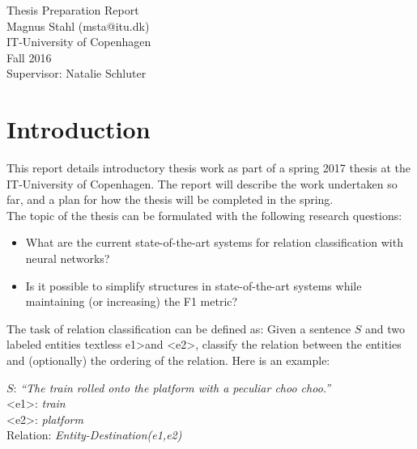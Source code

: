 \documentclass[12pt]{article}
\begin{document}
\begin{center}
    \vspace{2cm}
    \huge { Thesis Preparation Report \\ }
    \vspace{2cm}
    \large {Magnus Stahl (msta@itu.dk)\\
    IT-University of Copenhagen\\
    Fall 2016\\}
    \large {Supervisor: Natalie Schluter\\}
\end{center}


\tableofcontents

\newpage

    
\section{Introduction}
\label{intro}

This report details introductory thesis work as part of a spring 2017 thesis at the IT-University of Copenhagen. The report will describe the work undertaken so far, and a plan for how the thesis will be completed in the spring. \\

The topic of the thesis can be formulated with the following research questions:
\begin{itemize}
    \item What are the current state-of-the-art systems for relation classification 
    with neural networks?\\
    \item Is it possible to simplify structures in state-of-the-art systems while maintaining (or increasing) the F1 metric?
\end{itemize}

The task of relation classification can be defined as:
Given a sentence $S$ and two labeled entities textless e1\textgreater and \textless e2\textgreater, classify the relation between the entities and (optionally) the ordering of the relation. Here is an example:

\begin{center}

$S$: \emph{``The train rolled onto the platform with a peculiar choo choo.''} \\

\textless e1\textgreater: \emph{train} \\
\textless e2\textgreater: \emph{platform} \\

Relation: \emph{Entity-Destination(e1,e2)}

\end{center}
\end{document}
